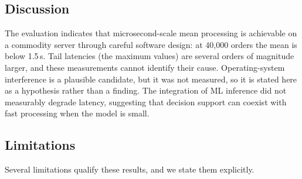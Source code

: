 \documentclass[10pt,a4paper,twocolumn]{article}
\newcommand{\us}{\,\textmu s}
\begin{document}
\subsection{Discussion}
The evaluation indicates that microsecond-scale mean processing is achievable on a commodity
server through careful software design: at 40{,}000 orders the mean is below 1.5\us{}.
Tail latencies (the maximum values) are several orders of magnitude larger, and these
measurements cannot identify their cause. Operating-system interference is a plausible
candidate, but it was not measured, so it is stated here as a hypothesis rather than a
finding. The integration of ML inference did not measurably
degrade latency, suggesting that decision support can coexist with fast processing when the
model is small.

\subsection{Limitations}\label{sec:limits}
Several limitations qualify these results, and we state them explicitly.
\end{document}
